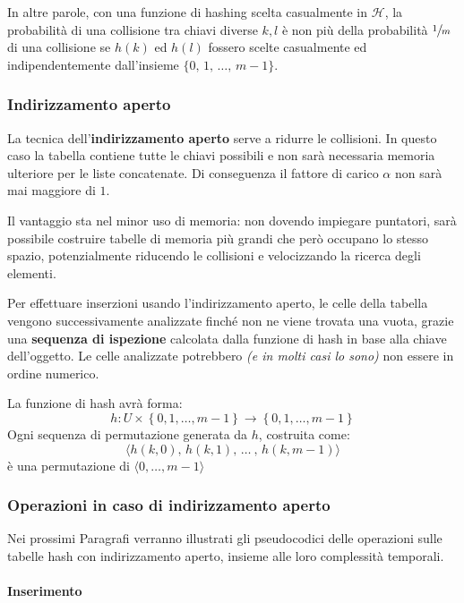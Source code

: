 \documentclass[italian, 10pt]{article}
\begin{document}
\bigskip
In altre parole, con una funzione di hashing scelta casualmente in \(\mathscr{H}\), la probabilità di una collisione tra chiavi diverse \(k, l\) è non più della probabilità \(\sfrac{1}{m}\) di una collisione se \(h(k)\) ed \(h(l)\) fossero scelte casualmente ed indipendentemente dall'insieme \(\{0, \, 1, \, \ldots, \, m-1\}\).

\subsubsection{Indirizzamento aperto}
La tecnica dell'\textbf{indirizzamento aperto} serve a ridurre le collisioni.
In questo caso la tabella contiene tutte le chiavi possibili e non sarà necessaria memoria ulteriore per le liste concatenate.
Di conseguenza il fattore di carico \(\alpha\) non sarà mai maggiore di \(1\).

Il vantaggio sta nel minor uso di memoria: non dovendo impiegare puntatori, sarà possibile costruire tabelle di memoria più grandi che però occupano lo stesso spazio, potenzialmente riducendo le collisioni e velocizzando la ricerca degli elementi.

Per effettuare inserzioni usando l'indirizzamento aperto, le celle della tabella vengono successivamente analizzate finché non ne viene trovata una vuota, grazie una \textbf{sequenza di ispezione} calcolata dalla funzione di hash in base alla chiave dell'oggetto.
Le celle analizzate potrebbero \textit{(e in molti casi lo sono)} non essere in ordine numerico.

La funzione di hash avrà forma:
\[ h: U \times \left\{0, 1, \ldots, m-1\right\} \rightarrow \left\{0, 1, \ldots, m-1\right\} \]
Ogni sequenza di permutazione generata da \(h\), costruita come:
\[\langle h(k, 0),\, h(k, 1),\, \ldots\ ,\, h(k, m-1)  \rangle\]
è una permutazione di \(\langle 0, \ldots, m-1\rangle\)

\subsubsection{Operazioni in caso di indirizzamento aperto}

Nei prossimi Paragrafi verranno illustrati gli pseudocodici delle operazioni sulle tabelle hash con indirizzamento aperto, insieme alle loro complessità temporali.

\paragraph{Inserimento}
\end{document}
